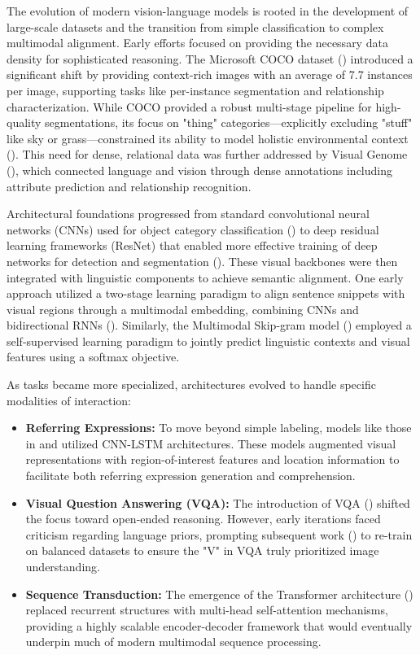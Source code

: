 \documentclass[11pt]{article}
\begin{document}
The evolution of modern vision-language models is rooted in the development of large-scale datasets and the transition from simple classification to complex multimodal alignment. Early efforts focused on providing the necessary data density for sophisticated reasoning. The Microsoft COCO dataset (\citep{1405.0312}) introduced a significant shift by providing context-rich images with an average of 7.7 instances per image, supporting tasks like per-instance segmentation and relationship characterization. While COCO provided a robust multi-stage pipeline for high-quality segmentations, its focus on "thing" categories—explicitly excluding "stuff" like sky or grass—constrained its ability to model holistic environmental context (\citep{1405.0312}). This need for dense, relational data was further addressed by Visual Genome (\citep{1602.07332}), which connected language and vision through dense annotations including attribute prediction and relationship recognition.

Architectural foundations progressed from standard convolutional neural networks (CNNs) used for object category classification (\citep{1409.0575}) to deep residual learning frameworks (ResNet) that enabled more effective training of deep networks for detection and segmentation (\citep{1512.03385}). These visual backbones were then integrated with linguistic components to achieve semantic alignment. One early approach utilized a two-stage learning paradigm to align sentence snippets with visual regions through a multimodal embedding, combining CNNs and bidirectional RNNs (\citep{1412.2306}). Similarly, the Multimodal Skip-gram model (\citep{1501.02598}) employed a self-supervised learning paradigm to jointly predict linguistic contexts and visual features using a softmax objective.

As tasks became more specialized, architectures evolved to handle specific modalities of interaction:

\begin{itemize}
  \item   \textbf{Referring Expressions:} To move beyond simple labeling, models like those in \citep{1511.02283} and \citep{1608.00272} utilized CNN-LSTM architectures. These models augmented visual representations with region-of-interest features and location information to facilitate both referring expression generation and comprehension.
  \item   \textbf{Visual Question Answering (VQA):} The introduction of VQA (\citep{1505.00468}) shifted the focus toward open-ended reasoning. However, early iterations faced criticism regarding language priors, prompting subsequent work (\citep{1612.00837}) to re-train on balanced datasets to ensure the "V" in VQA truly prioritized image understanding.
  \item   \textbf{Sequence Transduction:} The emergence of the Transformer architecture (\citep{1706.03762}) replaced recurrent structures with multi-head self-attention mechanisms, providing a highly scalable encoder-decoder framework that would eventually underpin much of modern multimodal sequence processing.
\end{itemize}
\end{document}
